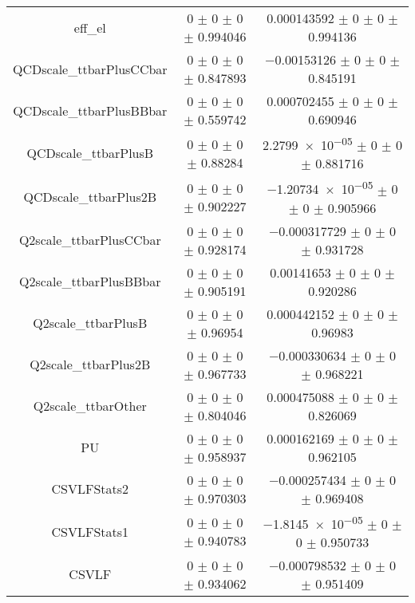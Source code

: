 \begin{table}
\begin{tabular}{ccc}
eff\_el 	& \num{0} $\pm$ \num{0} $\pm$ \num{0} $\pm$ \num{0.994046} 	& \num{0.000143592} $\pm$ \num{0} $\pm$ \num{0} $\pm$ \num{0.994136}\\
QCDscale\_ttbarPlusCCbar 	& \num{0} $\pm$ \num{0} $\pm$ \num{0} $\pm$ \num{0.847893} 	& \num{-0.00153126} $\pm$ \num{0} $\pm$ \num{0} $\pm$ \num{0.845191}\\
QCDscale\_ttbarPlusBBbar 	& \num{0} $\pm$ \num{0} $\pm$ \num{0} $\pm$ \num{0.559742} 	& \num{0.000702455} $\pm$ \num{0} $\pm$ \num{0} $\pm$ \num{0.690946}\\
QCDscale\_ttbarPlusB 	& \num{0} $\pm$ \num{0} $\pm$ \num{0} $\pm$ \num{0.88284} 	& \num{2.2799e-05} $\pm$ \num{0} $\pm$ \num{0} $\pm$ \num{0.881716}\\
QCDscale\_ttbarPlus2B 	& \num{0} $\pm$ \num{0} $\pm$ \num{0} $\pm$ \num{0.902227} 	& \num{-1.20734e-05} $\pm$ \num{0} $\pm$ \num{0} $\pm$ \num{0.905966}\\
Q2scale\_ttbarPlusCCbar 	& \num{0} $\pm$ \num{0} $\pm$ \num{0} $\pm$ \num{0.928174} 	& \num{-0.000317729} $\pm$ \num{0} $\pm$ \num{0} $\pm$ \num{0.931728}\\
Q2scale\_ttbarPlusBBbar 	& \num{0} $\pm$ \num{0} $\pm$ \num{0} $\pm$ \num{0.905191} 	& \num{0.00141653} $\pm$ \num{0} $\pm$ \num{0} $\pm$ \num{0.920286}\\
Q2scale\_ttbarPlusB 	& \num{0} $\pm$ \num{0} $\pm$ \num{0} $\pm$ \num{0.96954} 	& \num{0.000442152} $\pm$ \num{0} $\pm$ \num{0} $\pm$ \num{0.96983}\\
Q2scale\_ttbarPlus2B 	& \num{0} $\pm$ \num{0} $\pm$ \num{0} $\pm$ \num{0.967733} 	& \num{-0.000330634} $\pm$ \num{0} $\pm$ \num{0} $\pm$ \num{0.968221}\\
Q2scale\_ttbarOther 	& \num{0} $\pm$ \num{0} $\pm$ \num{0} $\pm$ \num{0.804046} 	& \num{0.000475088} $\pm$ \num{0} $\pm$ \num{0} $\pm$ \num{0.826069}\\
PU 	& \num{0} $\pm$ \num{0} $\pm$ \num{0} $\pm$ \num{0.958937} 	& \num{0.000162169} $\pm$ \num{0} $\pm$ \num{0} $\pm$ \num{0.962105}\\
CSVLFStats2 	& \num{0} $\pm$ \num{0} $\pm$ \num{0} $\pm$ \num{0.970303} 	& \num{-0.000257434} $\pm$ \num{0} $\pm$ \num{0} $\pm$ \num{0.969408}\\
CSVLFStats1 	& \num{0} $\pm$ \num{0} $\pm$ \num{0} $\pm$ \num{0.940783} 	& \num{-1.8145e-05} $\pm$ \num{0} $\pm$ \num{0} $\pm$ \num{0.950733}\\
CSVLF 	& \num{0} $\pm$ \num{0} $\pm$ \num{0} $\pm$ \num{0.934062} 	& \num{-0.000798532} $\pm$ \num{0} $\pm$ \num{0} $\pm$ \num{0.951409}\\

\end{tabular}
\end{table}

